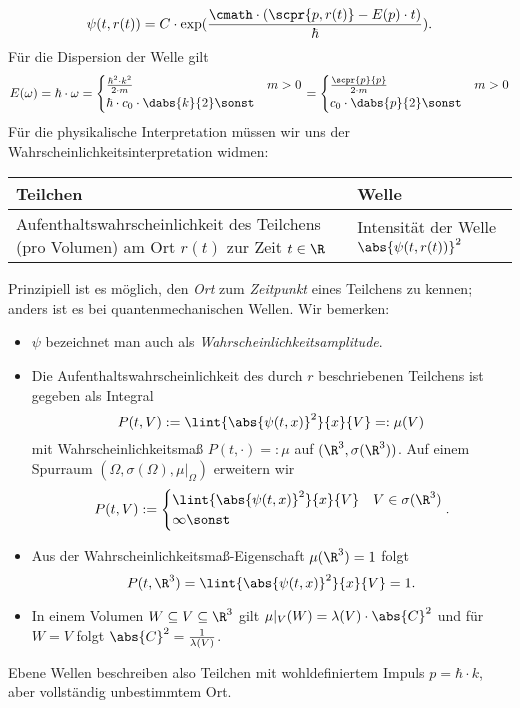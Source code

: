 \documentclass{article}
\begin{document}
        \[\psi(t,r(t)) = C\cdot\exp(\frac{\cmath\cdot (\scpr{p,r(t)}-E(p)\cdot t)}{\hbar}).\]
        Für die Dispersion der Welle gilt 
        \[E(\omega) = \hbar\cdot\omega = \begin{cases}
            \frac{\hbar^2\cdot k^2}{2\cdot m} & m>0 \\
            \hbar\cdot c_0\cdot \dabs{k}{2} \sonst
        \end{cases} = \begin{cases}
            \frac{\scpr{p}{p}}{2\cdot m} & m>0 \\
            c_0\cdot\dabs{p}{2} \sonst
        \end{cases}\]
        Für die physikalische Interpretation müssen wir uns der Wahrscheinlichkeitsinterpretation widmen: 
        \begin{table}[H]
            \centering
            \begin{tabular}{p{5cm}|p{5cm}}
                Teilchen & Welle \\
                \hline
                Aufenthaltswahrscheinlichkeit des Teilchens (pro Volumen) am Ort $r(t)$ zur Zeit $t\in\R$ & Intensität der Welle $\abs{\psi(t,r(t))}^2$ \\
            \end{tabular}
        \end{table}
        Prinzipiell ist es möglich, den \emph{Ort} zum \emph{Zeitpunkt} eines Teilchens zu kennen; anders ist es bei quantenmechanischen Wellen. Wir bemerken:
        \begin{itemize}[label=$\to$]
            \item $\psi$ bezeichnet man auch als \emph{Wahrscheinlichkeitsamplitude}. 
            \item Die Aufenthaltswahrscheinlichkeit des durch $r$ beschriebenen Teilchens ist gegeben als Integral 
            \[P(t,V) := \lint{\abs{\psi(t,x)}^2}{x}{V} =: \mu(V)\]
            mit Wahrscheinlichkeitsmaß $P(t,\cdot)=:\mu$ auf $(\R^3,\sigma(\R^3))$. Auf einem Spurraum $(\Omega,\sigma(\Omega),\mu|_\Omega)$ erweitern wir 
            \[P(t,V) := \begin{cases}
                \lint{\abs{\psi(t,x)}^2}{x}{V} & V\in\sigma(\R^3) \\
                \infty \sonst
            \end{cases}.\]
            \item Aus der Wahrscheinlichkeitsmaß-Eigenschaft $\mu(\R^3) = 1$ folgt
            \[P(t,\R^3) = \lint{\abs{\psi(t,x)}^2}{x}{V} = 1.\]
            \item In einem Volumen $W\subseteq V\subseteq\R^3$ gilt $\mu|_V(W) = \lambda(V)\cdot\abs{C}^2$ und für $W=V$ folgt $\abs{C}^2 = \frac{1}{\lambda(V)}$.
        \end{itemize}
        Ebene Wellen beschreiben also Teilchen mit wohldefiniertem Impuls $p = \hbar\cdot k$, aber vollständig unbestimmtem Ort.
\end{document}
